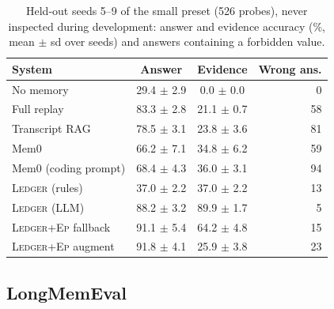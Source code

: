 \documentclass[10pt,conference]{IEEEtran}
\newcommand{\sys}{\textsc{Ledger}}
\newcommand{\hyb}{\textsc{Ledger+Ep}}
\begin{document}
\begin{table}[t]
\caption{Held-out seeds 5--9 of the small preset (526 probes), never inspected
during development: answer and evidence accuracy (\%, mean $\pm$ sd over seeds)
and answers containing a forbidden value.}
\label{tab:heldout}
\centering
\footnotesize
\begin{tabular}{@{}lccr@{}}
\toprule
System & Answer & Evidence & Wrong ans. \\
\midrule
No memory & 29.4 $\pm$ 2.9 & 0.0 $\pm$ 0.0 & 0 \\
Full replay & 83.3 $\pm$ 2.8 & 21.1 $\pm$ 0.7 & 58 \\
Transcript RAG & 78.5 $\pm$ 3.1 & 23.8 $\pm$ 3.6 & 81 \\
Mem0 & 66.2 $\pm$ 7.1 & 34.8 $\pm$ 6.2 & 59 \\
Mem0 (coding prompt) & 68.4 $\pm$ 4.3 & 36.0 $\pm$ 3.1 & 94 \\
\sys{} (rules) & 37.0 $\pm$ 2.2 & 37.0 $\pm$ 2.2 & 13 \\
\sys{} (LLM) & 88.2 $\pm$ 3.2 & 89.9 $\pm$ 1.7 & 5 \\
\hyb{} fallback & 91.1 $\pm$ 5.4 & 64.2 $\pm$ 4.8 & 15 \\
\hyb{} augment & 91.8 $\pm$ 4.1 & 25.9 $\pm$ 3.8 & 23 \\
\bottomrule
\end{tabular}
\end{table}

\subsection{LongMemEval}
\end{document}

